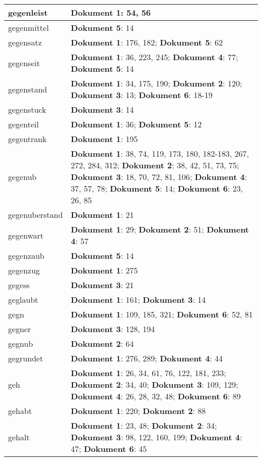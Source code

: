 \documentclass[a5paper]{article}
\begin{document}
\begin{longtable}[l]{|l|p{3in}|}
\hline
gegenleist & \textbf{Dokument 1}: 54, 56 \\
\hline
gegenmittel & \textbf{Dokument 5}: 14 \\
\hline
gegensatz & \textbf{Dokument 1}: 176, 182; \textbf{Dokument 5}: 62 \\
\hline
gegenseit & \textbf{Dokument 1}: 36, 223, 245; \textbf{Dokument 4}: 77; \textbf{Dokument 5}: 14 \\
\hline
gegenstand & \textbf{Dokument 1}: 34, 175, 190; \textbf{Dokument 2}: 120; \textbf{Dokument 3}: 13; \textbf{Dokument 6}: 18-19 \\
\hline
gegenstuck & \textbf{Dokument 3}: 14 \\
\hline
gegenteil & \textbf{Dokument 1}: 36; \textbf{Dokument 5}: 12 \\
\hline
gegentrank & \textbf{Dokument 1}: 195 \\
\hline
gegenub & \textbf{Dokument 1}: 38, 74, 119, 173, 180, 182-183, 267, 272, 284, 312; \textbf{Dokument 2}: 38, 42, 51, 73, 75; \textbf{Dokument 3}: 18, 70, 72, 81, 106; \textbf{Dokument 4}: 37, 57, 78; \textbf{Dokument 5}: 14; \textbf{Dokument 6}: 23, 26, 85 \\
\hline
gegenuberstand & \textbf{Dokument 1}: 21 \\
\hline
gegenwart & \textbf{Dokument 1}: 29; \textbf{Dokument 2}: 51; \textbf{Dokument 4}: 57 \\
\hline
gegenzaub & \textbf{Dokument 5}: 14 \\
\hline
gegenzug & \textbf{Dokument 1}: 275 \\
\hline
gegess & \textbf{Dokument 3}: 21 \\
\hline
geglaubt & \textbf{Dokument 1}: 161; \textbf{Dokument 3}: 14 \\
\hline
gegn & \textbf{Dokument 1}: 109, 185, 321; \textbf{Dokument 6}: 52, 81 \\
\hline
gegner & \textbf{Dokument 3}: 128, 194 \\
\hline
gegnub & \textbf{Dokument 2}: 64 \\
\hline
gegrundet & \textbf{Dokument 1}: 276, 289; \textbf{Dokument 4}: 44 \\
\hline
geh & \textbf{Dokument 1}: 26, 34, 61, 76, 122, 181, 233; \textbf{Dokument 2}: 34, 40; \textbf{Dokument 3}: 109, 129; \textbf{Dokument 4}: 26, 28, 32, 48; \textbf{Dokument 6}: 89 \\
\hline
gehabt & \textbf{Dokument 1}: 220; \textbf{Dokument 2}: 88 \\
\hline
gehalt & \textbf{Dokument 1}: 23, 48; \textbf{Dokument 2}: 34; \textbf{Dokument 3}: 98, 122, 160, 199; \textbf{Dokument 4}: 47; \textbf{Dokument 6}: 45 \\

\end{longtable}
\end{document}
